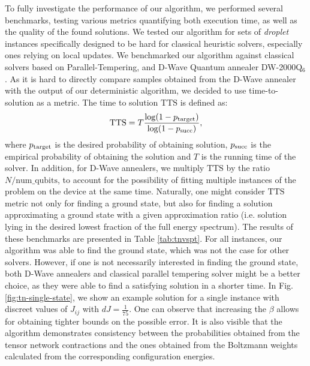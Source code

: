 To fully investigate the performance of our algorithm, we performed several
benchmarks, testing various metrics quantifying both execution time, as well as
the quality of the found solutions. We tested our algorithm for sets of
\emph{droplet} instances specifically designed to be hard for classical
heuristic solvers, especially ones relying on local updates. We benchmarked our
algorithm against classical solvers based on Parallel-Tempering, and D-Wave
Quantum annealer DW-2000Q$_6$. As it is hard to directly compare samples
obtained from the D-Wave annealer with the output of our deterministic
algorithm, we decided to use time-to-solution as a metric. The time to solution
$\mbox{TTS}$ is defined as:
\begin{equation}
  \label{eq:tts}
  \mbox{TTS} = T \frac{\log(1 - p_{\text{target}})}{\log(1 - p_{\text{succ}})},
\end{equation}
where $p_{\text{target}}$ is the desired probability of obtaining solution, $p_{\text{succ}}$
is the empirical probability of obtaining the solution and $T$ is the running
time of the solver. In addition, for D-Wave annealers, we multiply $\mbox{TTS}$
by the ratio $N/\mbox{num\_qubits}$, to account for the possibility of fitting
multiple instances of the problem on the device at the same time. Naturally,
one might consider $\mbox{TTS}$ metric not only for finding a ground state, but
also for finding a solution approximating a ground state with a given
approximation ratio (i.e. solution lying in the desired lowest fraction of the
full energy spectrum). The results of these benchmarks are presented in Table
\ref{tab:tnvspt}. For all instances, our algorithm was able to find the ground
state, which was not the case for other solvers. However, if one is not
necessarily interested in finding the ground state, both D-Wave annealers and
classical parallel tempering solver might be a better choice, as they were able
to find a satisfying solution in a shorter time. In Fig.
\ref{fig:tn-single-state}, we show an example solution for a single instance
with discreet values of $J_{ij}$ with $dJ=\frac{1}{75}$. One can observe that
increasing the $\beta$ allows for obtaining tighter bounds on the possible
error. It is also visible that the algorithm demonstrates consistency between
the probabilities obtained from the tensor network contractions and the ones
obtained from the Boltzmann weights calculated from the corresponding
configuration energies.

